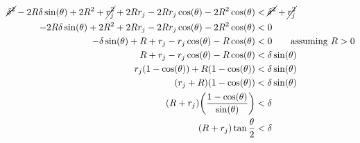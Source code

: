 \documentclass[conference]{IEEEtran}
\begin{document}
\begin{align*}
      \cancel{\delta^2} - 2R\delta\sin(\theta) + 2R^2 + \cancel{r_j^2} + 2Rr_j - 2Rr_j\cos(\theta) - 2R^2\cos(\theta) &< \cancel{\delta^2} + \cancel{r_j^2} \\
      -2R\delta\sin(\theta) + 2R^2 + 2Rr_j - 2Rr_j\cos(\theta) - 2R^2\cos(\theta) &< 0 \\
      -\delta\sin(\theta) + R + r_j - r_j\cos(\theta) - R\cos(\theta) &< 0 \qquad \text{assuming $R>0$}\\
      R + r_j - r_j\cos(\theta) - R\cos(\theta) &< \delta\sin(\theta) \\
      r_j(1 - \cos(\theta)) + R(1 - \cos(\theta)) &< \delta\sin(\theta) \\
      (r_j+R)(1 - \cos(\theta)) &< \delta\sin(\theta) \\
      (R+r_j)\bigg(\frac{1 - \cos(\theta)}{\sin(\theta)}\bigg) &< \delta \\
      (R+r_j)\tan{\frac{\theta}{2}}  &< \delta \\
    \end{align*}
\end{document}
